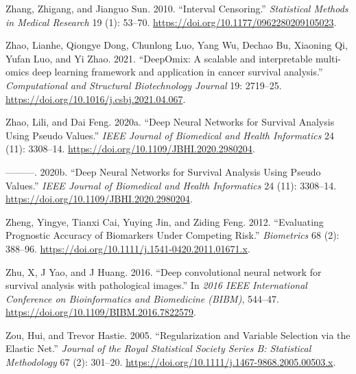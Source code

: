 \documentclass[
  letterpaper,
  krantz2]{style/krantz}
\newlength{\cslhangindent}
\newenvironment{CSLReferences}[2] %
 {\begin{list}{}{%
  \setlength{\itemindent}{0pt}
  \setlength{\leftmargin}{0pt}
  \setlength{\parsep}{0pt}
  \ifodd #1
   \setlength{\leftmargin}{\cslhangindent}
   \setlength{\itemindent}{-1\cslhangindent}
  \fi
  \setlength{\itemsep}{#2\baselineskip}}}
 {\end{list}}
\begin{document}
\begin{CSLReferences}{1}{0}
Zhang, Zhigang, and Jianguo Sun. 2010. {``Interval Censoring.''}
\emph{Statistical Methods in Medical Research} 19 (1): 53--70.
\url{https://doi.org/10.1177/0962280209105023}.

Zhao, Lianhe, Qiongye Dong, Chunlong Luo, Yang Wu, Dechao Bu, Xiaoning
Qi, Yufan Luo, and Yi Zhao. 2021. {``{DeepOmix: A scalable and
interpretable multi-omics deep learning framework and application in
cancer survival analysis}.''} \emph{Computational and Structural
Biotechnology Journal} 19: 2719--25.
\url{https://doi.org/10.1016/j.csbj.2021.04.067}.

Zhao, Lili, and Dai Feng. 2020a. {``{Deep Neural Networks for Survival
Analysis Using Pseudo Values}.''} \emph{IEEE Journal of Biomedical and
Health Informatics} 24 (11): 3308--14.
\url{https://doi.org/10.1109/JBHI.2020.2980204}.

---------. 2020b. {``{Deep Neural Networks for Survival Analysis Using
Pseudo Values}.''} \emph{IEEE Journal of Biomedical and Health
Informatics} 24 (11): 3308--14.
\url{https://doi.org/10.1109/JBHI.2020.2980204}.

Zheng, Yingye, Tianxi Cai, Yuying Jin, and Ziding Feng. 2012.
{``Evaluating Prognostic Accuracy of Biomarkers Under Competing Risk.''}
\emph{Biometrics} 68 (2): 388--96.
\url{https://doi.org/10.1111/j.1541-0420.2011.01671.x}.

Zhu, X, J Yao, and J Huang. 2016. {``{Deep convolutional neural network
for survival analysis with pathological images}.''} In \emph{2016 IEEE
International Conference on Bioinformatics and Biomedicine (BIBM)},
544--47. \url{https://doi.org/10.1109/BIBM.2016.7822579}.

Zou, Hui, and Trevor Hastie. 2005. {``Regularization and Variable
Selection via the Elastic Net.''} \emph{Journal of the Royal Statistical
Society Series B: Statistical Methodology} 67 (2): 301--20.
\url{https://doi.org/10.1111/j.1467-9868.2005.00503.x}.

\end{CSLReferences}



\printindex
\end{document}
